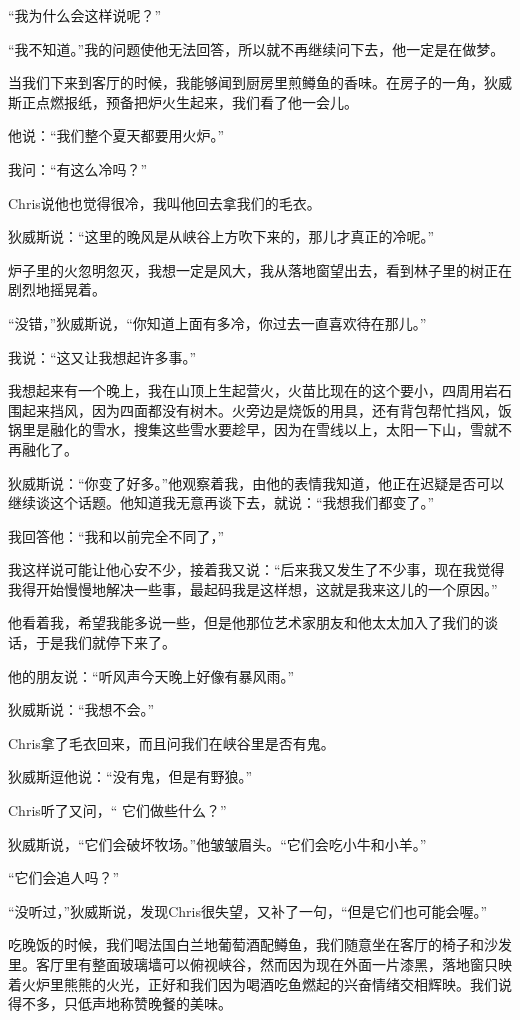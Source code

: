 \documentclass[UTF8]{article}
\begin{document}
\par “我为什么会这样说呢？”
\par “我不知道。”我的问题使他无法回答，所以就不再继续问下去，他一定是在做梦。
\par 当我们下来到客厅的时候，我能够闻到厨房里煎鳟鱼的香味。在房子的一角，狄威斯正点燃报纸，预备把炉火生起来，我们看了他一会儿。
\par 他说：“我们整个夏天都要用火炉。”
\par 我问：“有这么冷吗？”
\par Chris说他也觉得很冷，我叫他回去拿我们的毛衣。
\par 狄威斯说：“这里的晚风是从峡谷上方吹下来的，那儿才真正的冷呢。”
\par 炉子里的火忽明忽灭，我想一定是风大，我从落地窗望出去，看到林子里的树正在剧烈地摇晃着。
\par “没错，”狄威斯说，“你知道上面有多冷，你过去一直喜欢待在那儿。”
\par 我说：“这又让我想起许多事。”
\par 我想起来有一个晚上，我在山顶上生起营火，火苗比现在的这个要小，四周用岩石围起来挡风，因为四面都没有树木。火旁边是烧饭的用具，还有背包帮忙挡风，饭锅里是融化的雪水，搜集这些雪水要趁早，因为在雪线以上，太阳一下山，雪就不再融化了。
\par 狄威斯说：“你变了好多。”他观察着我，由他的表情我知道，他正在迟疑是否可以继续谈这个话题。他知道我无意再谈下去，就说：“我想我们都变了。”
\par 我回答他：“我和以前完全不同了，”
\par 我这样说可能让他心安不少，接着我又说：“后来我又发生了不少事，现在我觉得我得开始慢慢地解决一些事，最起码我是这样想，这就是我来这儿的一个原因。”
\par 他看着我，希望我能多说一些，但是他那位艺术家朋友和他太太加入了我们的谈话，于是我们就停下来了。
\par 他的朋友说：“听风声今天晚上好像有暴风雨。”
\par 狄威斯说：“我想不会。”
\par Chris拿了毛衣回来，而且问我们在峡谷里是否有鬼。
\par 狄威斯逗他说：“没有鬼，但是有野狼。”
\par Chris听了又问，“ 它们做些什么？”
\par 狄威斯说，“它们会破坏牧场。”他皱皱眉头。“它们会吃小牛和小羊。”
\par “它们会追人吗？”
\par “没听过，”狄威斯说，发现Chris很失望，又补了一句，“但是它们也可能会喔。”
\par 吃晚饭的时候，我们喝法国白兰地葡萄酒配鳟鱼，我们随意坐在客厅的椅子和沙发里。客厅里有整面玻璃墙可以俯视峡谷，然而因为现在外面一片漆黑，落地窗只映着火炉里熊熊的火光，正好和我们因为喝酒吃鱼燃起的兴奋情绪交相辉映。我们说得不多，只低声地称赞晚餐的美味。
\end{document}
